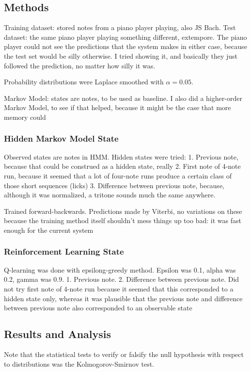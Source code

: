 \documentclass{article}
\begin{document}
\subsection*{Methods}
Training dataset: stored notes from a piano player playing, also JS Bach.
Test dataset: the same piano player playing something different, extempore. %
The piano player could not see the predictions that the system makes in either case, because the test set would be silly otherwise. I tried showing it, and basically they just followed the prediction, no matter how silly it was.

Probability distributions were Laplace smoothed with $\alpha = 0.05$.

Markov Model: states are notes, to be used as baseline. I also did a higher-order Markov Model, to see if that helped, because it might be the case that more memory could 

\subsubsection*{Hidden Markov Model State}
Observed states are notes in HMM.
Hidden states were tried:
1. Previous note, because that could be construed as a hidden state, really
2. First note of 4-note run, because it seemed that a lot of four-note runs produce a certain class of those short sequences (licks)
3. Difference between previous note, because, although it was normalized, a tritone sounds much the same anywhere.

Trained forward-backwards. Predictions made by Viterbi, no variations on these because the training method itself shouldn't mess things up too bad: it was fast enough for the current system

\subsubsection*{Reinforcement Learning State}
Q-learning was done with epsilong-greedy method. Epsilon was 0.1, alpha was 0.2, gamma was 0.9. %
1. Previous note.
2. Difference between previous note.
Did not try first note of 4-note run because it seemed that this corresponded to a hidden state only, whereas it was plausible that the previous note and difference between previous note also corresponded to an observable state

\subsection*{Results and Analysis}
Note that the statistical tests to verify or falsify the null hypothesis with respect to distributions was the Kolmogorov-Smirnov test. %
\end{document}
